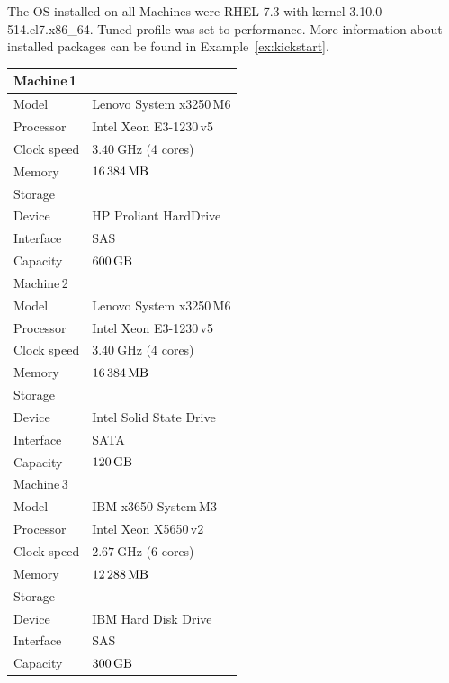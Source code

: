 \documentclass[
  color, %
  table, %
  lof,   %
  lot,   %
]{fithesis3}
\begin{document}
The OS installed on all Machines were RHEL-7.3 with kernel 3.10.0-514.el7.x86\_64. Tuned profile was set to performance. More information about installed packages can be found in Example~\ref{ex:kickstart}.

\clearpage

\begin{tabular}{|l|l|}
\hline
   \multicolumn{2}{|l|}{Machine\,1} \\ \hline %
    Model & Lenovo System x3250\,M6 \\
    \hline
    Processor & Intel Xeon E3-1230\,v5 \\
    \hline
    Clock speed & $\SI{3.40}{\giga\hertz}$ (4 cores) \\
    \hline
    Memory & $\SI{16384}{\mega\byte}$ \\
    \hline
    \multicolumn{2}{|l|}{Storage} \\ \hline
    Device & HP Proliant HardDrive\\ \hline
    Interface & SAS\\ \hline
    Capacity & $\SI{600}{\giga\byte}$\\ \hline
\hline
   \multicolumn{2}{|l|}{Machine\,2} \\ \hline %
    Model & Lenovo System x3250\,M6 \\
    \hline
    Processor & Intel Xeon E3-1230\,v5 \\
    \hline
    Clock speed & $\SI{3.40}{\giga\hertz}$ (4 cores) \\
    \hline
    Memory & $\SI{16384}{\mega\byte}$ \\
    \hline
    \multicolumn{2}{|l|}{Storage} \\ \hline
    Device & Intel Solid State Drive \\ \hline
    Interface & SATA\\ \hline
    Capacity & $\SI{120}{\giga\byte}$\\ \hline
\hline
   \multicolumn{2}{|l|}{Machine\,3} \\ \hline %
    Model & IBM x3650 System\,M3 \\
    \hline
    Processor & Intel Xeon X5650\,v2 \\
    \hline
    Clock speed & $\SI{2.67}{\giga\hertz}$  (6 cores) \\
    \hline
    Memory &  $\SI{12288}{\mega\byte}$\\
    \hline
    \multicolumn{2}{|l|}{Storage} \\ \hline
    Device & IBM Hard Disk Drive\\ \hline
    Interface &  SAS\\ \hline
    Capacity & $\SI{300}{\giga\byte}$\\ \hline
\end{tabular}
\label{machines}
\end{document}
